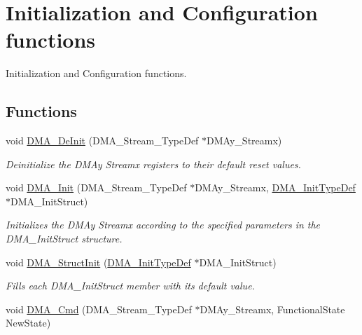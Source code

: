 \hypertarget{group___d_m_a___group1}{\section{Initialization and Configuration functions}
\label{group___d_m_a___group1}
}


Initialization and Configuration functions.  


\subsection*{Functions}
\begin{DoxyCompactItemize}
\item 
void \hyperlink{group___d_m_a___group1_ga38d4a4ab8990299f8a6cf064e1e811d0}{D\-M\-A\-\_\-\-De\-Init} (D\-M\-A\-\_\-\-Stream\-\_\-\-Type\-Def $\ast$D\-M\-Ay\-\_\-\-Streamx)
\begin{DoxyCompactList}\small\item\em Deinitialize the D\-M\-Ay Streamx registers to their default reset values. \end{DoxyCompactList}\item 
void \hyperlink{group___d_m_a___group1_gaced8a4149acfb0a50b50e63273a87148}{D\-M\-A\-\_\-\-Init} (D\-M\-A\-\_\-\-Stream\-\_\-\-Type\-Def $\ast$D\-M\-Ay\-\_\-\-Streamx, \hyperlink{struct_d_m_a___init_type_def}{D\-M\-A\-\_\-\-Init\-Type\-Def} $\ast$D\-M\-A\-\_\-\-Init\-Struct)
\begin{DoxyCompactList}\small\item\em Initializes the D\-M\-Ay Streamx according to the specified parameters in the D\-M\-A\-\_\-\-Init\-Struct structure. \end{DoxyCompactList}\item 
void \hyperlink{group___d_m_a___group1_ga0f7f95f750a90a6824f4e9b6f58adc7e}{D\-M\-A\-\_\-\-Struct\-Init} (\hyperlink{struct_d_m_a___init_type_def}{D\-M\-A\-\_\-\-Init\-Type\-Def} $\ast$D\-M\-A\-\_\-\-Init\-Struct)
\begin{DoxyCompactList}\small\item\em Fills each D\-M\-A\-\_\-\-Init\-Struct member with its default value. \end{DoxyCompactList}\item 
void \hyperlink{group___d_m_a___group1_gab2bea22f9f6dc62fdd7afb385a0c1f73}{D\-M\-A\-\_\-\-Cmd} (D\-M\-A\-\_\-\-Stream\-\_\-\-Type\-Def $\ast$D\-M\-Ay\-\_\-\-Streamx, Functional\-State New\-State)

\end{DoxyCompactItemize}
